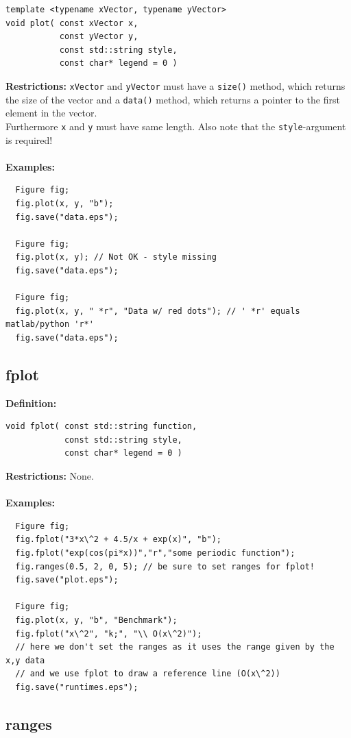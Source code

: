\documentclass[a4paper]{article}
\newcommand{\command}[1]{\subsection{#1}}
\begin{document}
\begin{lstlisting}
template <typename xVector, typename yVector>
void plot( const xVector x, 
           const yVector y, 
           const std::string style, 
           const char* legend = 0 ) 
\end{lstlisting}
\textbf{Restrictions:} \texttt{xVector} and \texttt{yVector} must have a \texttt{size()} method, which returns the size of the vector 
and a \texttt{data()} method, which returns a pointer to the first element in the vector. \\
Furthermore \texttt{x} and \texttt{y} must have same length. Also note that the \texttt{style}-argument is required! \\ \\
%
\textbf{Examples:}
\begin{lstlisting}
  Figure fig;
  fig.plot(x, y, "b");
  fig.save("data.eps");

  Figure fig;
  fig.plot(x, y); // Not OK - style missing
  fig.save("data.eps");

  Figure fig;
  fig.plot(x, y, " *r", "Data w/ red dots"); // ' *r' equals matlab/python 'r*'
  fig.save("data.eps");
\end{lstlisting}

\command{fplot}

\textbf{Definition:}
\begin{lstlisting}
void fplot( const std::string function,
            const std::string style,
            const char* legend = 0 )
\end{lstlisting}
\textbf{Restrictions:} None. \\ \\
%
\textbf{Examples:}
\begin{lstlisting}
  Figure fig;
  fig.fplot("3*x\^2 + 4.5/x + exp(x)", "b");
  fig.fplot("exp(cos(pi*x))","r","some periodic function");
  fig.ranges(0.5, 2, 0, 5); // be sure to set ranges for fplot!
  fig.save("plot.eps");

  Figure fig;
  fig.plot(x, y, "b", "Benchmark");
  fig.fplot("x\^2", "k;", "\\ O(x\^2)");
  // here we don't set the ranges as it uses the range given by the x,y data
  // and we use fplot to draw a reference line (O(x\^2))
  fig.save("runtimes.eps"); 
\end{lstlisting}

\newpage
\command{ranges}
\end{document}
